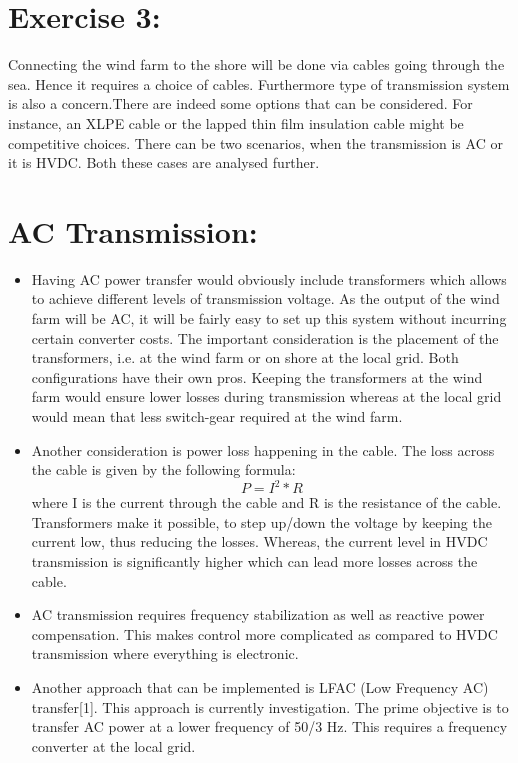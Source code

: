 \section*{\textbf{Exercise 3: }}
Connecting the wind farm to the shore will be done via cables going through the sea. Hence it requires a choice of cables. Furthermore type of transmission system is also a concern.There are indeed some options that can be considered. For instance, an XLPE cable or the lapped thin film insulation cable might be competitive choices.
There can be two scenarios, when the transmission is AC or it is HVDC. Both these cases are analysed further.
\section{AC Transmission:}
\begin{itemize}
    \item Having AC power transfer would obviously include transformers which allows to achieve different levels of transmission voltage. As the output of the wind farm will be AC, it will be fairly easy to set up this system without incurring certain converter costs. The important consideration is the placement of  the transformers, i.e. at the wind farm or on shore at the local grid.  Both configurations have their own pros. Keeping the transformers at the wind farm would ensure lower losses during transmission whereas at the local grid would mean that less switch-gear required at the wind farm.
    \item Another consideration is power loss happening in the cable. The loss across the cable is given by the following formula:
\[ P=I^{2}*R\]
 where I is the current through the cable and R is the resistance of the cable. Transformers make it possible, to step up/down the voltage by keeping the current low, thus reducing the losses. Whereas, the current level in HVDC transmission is significantly higher which can lead more losses across the cable.
 
 \item AC transmission requires frequency stabilization as well as reactive power compensation. This makes control more complicated as compared to HVDC transmission where everything is electronic. 
 
 \item Another approach that can be implemented is LFAC (Low Frequency AC) transfer[1]. This approach is currently investigation. The prime objective is to transfer AC power at a lower frequency of 50/3 Hz. 
 This requires a frequency converter at the local grid.
 
\end{itemize}

